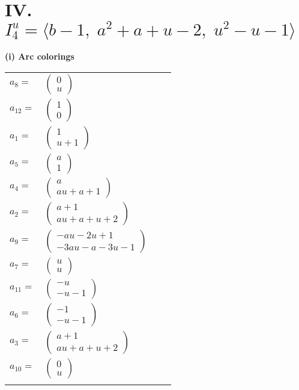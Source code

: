 \documentclass[1p]{elsarticle_modified}
\theoremstyle{definition}
\begin{document}
\centering \section*{IV. $I^u_{4}= \langle b-1,\;a^2+a+u-2,\;u^2- u-1 \rangle$}
\flushleft \textbf{(i) Arc colorings}\\
\begin{tabular}{m{7pt} m{180pt} m{7pt} m{180pt} }
\flushright $a_{8}=$&$\begin{pmatrix}0\\u\end{pmatrix}$ \\
\flushright $a_{12}=$&$\begin{pmatrix}1\\0\end{pmatrix}$ \\
\flushright $a_{1}=$&$\begin{pmatrix}1\\u+1\end{pmatrix}$ \\
\flushright $a_{5}=$&$\begin{pmatrix}a\\1\end{pmatrix}$ \\
\flushright $a_{4}=$&$\begin{pmatrix}a\\a u+a+1\end{pmatrix}$ \\
\flushright $a_{2}=$&$\begin{pmatrix}a+1\\a u+a+u+2\end{pmatrix}$ \\
\flushright $a_{9}=$&$\begin{pmatrix}- a u-2 u+1\\-3 a u- a-3 u-1\end{pmatrix}$ \\
\flushright $a_{7}=$&$\begin{pmatrix}u\\u\end{pmatrix}$ \\
\flushright $a_{11}=$&$\begin{pmatrix}- u\\- u-1\end{pmatrix}$ \\
\flushright $a_{6}=$&$\begin{pmatrix}-1\\- u-1\end{pmatrix}$ \\
\flushright $a_{3}=$&$\begin{pmatrix}a+1\\a u+a+u+2\end{pmatrix}$ \\
\flushright $a_{10}=$&$\begin{pmatrix}0\\u\end{pmatrix}$\\&\end{tabular}
\end{document}
